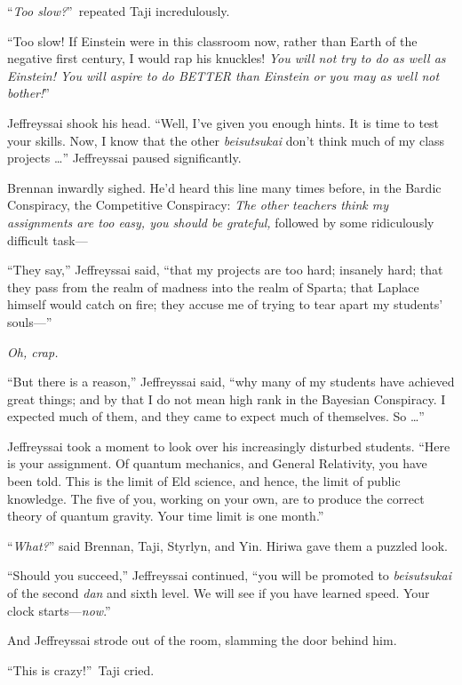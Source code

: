 {
 ``\textit{Too slow?}''~repeated
Taji incredulously.}

{
 ``Too slow! If Einstein were in this classroom
now, rather than Earth of the negative first century, I would rap his
knuckles! \textit{You will not try to do as well as Einstein! You will
aspire to do BETTER than Einstein or you may as well not
bother!}''}

{
 Jeffreyssai shook his head. ``Well,
I've given you enough hints. It is time to test your
skills. Now, I know that the other \textit{beisutsukai}
don't think much of my class projects
\ldots'' Jeffreyssai paused significantly.}

{
 Brennan inwardly sighed. He'd heard this line many
times before, in the Bardic Conspiracy, the Competitive Conspiracy:
\textit{The other teachers think my assignments are too easy, you
should be grateful,} followed by some ridiculously difficult task---}

{
 ``They say,'' Jeffreyssai said,
``that my projects are too hard; insanely hard; that
they pass from the realm of madness into the realm of Sparta; that
Laplace himself would catch on fire; they accuse me of trying to tear
apart my students' souls---''}

{
 \textit{Oh, crap.}}

{
 ``But there is a reason,''
Jeffreyssai said, ``why many of my students have
achieved great things; and by that I do not mean high rank in the
Bayesian Conspiracy. I expected much of them, and they came to expect
much of themselves. So \ldots''}

{
 Jeffreyssai took a moment to look over his increasingly disturbed
students. ``Here is your assignment. Of quantum
mechanics, and General Relativity, you have been told. This is the
limit of Eld science, and hence, the limit of public knowledge. The
five of you, working on your own, are to produce the correct theory of
quantum gravity. Your time limit is one month.''}

{
 ``\textit{What?}'' said
Brennan, Taji, Styrlyn, and Yin. Hiriwa gave them a puzzled look.}

{
 ``Should you succeed,''
Jeffreyssai continued, ``you will be promoted to
\textit{beisutsukai} of the second \textit{dan} and sixth level. We
will see if you have learned speed. Your clock
starts---\textit{now}.''}

{
 And Jeffreyssai strode out of the room, slamming the door behind
him.}

{
 ``This is crazy!''~Taji cried.}

